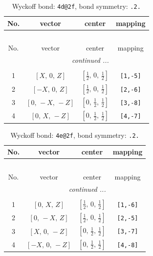 \documentclass[fleqn,8pt]{jsarticle}
\begin{document}
\begin{longtable}{cccc}
\caption{Wyckoff bond: {\tt 4d@2f}, bond symmetry: {\tt .2.}}
 \\
 \hline \hline
No. & vector & center & mapping \\ \hline \endfirsthead

\multicolumn{3}{l}{\tablename\ \thetable{}} \\
 \hline \hline
No. & vector & center & mapping \\ \hline \endhead

 \hline \hline
\multicolumn{3}{r}{\footnotesize\it continued ...} \\ \endfoot

 \hline \hline
\multicolumn{3}{r}{} \\ \endlastfoot

1 & $\left[ X,\, 0,\, Z \right]$ & $\left[ \frac{1}{2},\, 0,\, \frac{1}{2} \right]$ & {\tt [1,-5]} \\ \hline
2 & $\left[ - X,\, 0,\, Z \right]$ & $\left[ \frac{1}{2},\, 0,\, \frac{1}{2} \right]$ & {\tt [2,-6]} \\ \hline
3 & $\left[ 0,\, - X,\, - Z \right]$ & $\left[ 0,\, \frac{1}{2},\, \frac{1}{2} \right]$ & {\tt [3,-8]} \\ \hline
4 & $\left[ 0,\, X,\, - Z \right]$ & $\left[ 0,\, \frac{1}{2},\, \frac{1}{2} \right]$ & {\tt [4,-7]} \\
\end{longtable}
\renewcommand{\arraystretch}{1.2}
\begin{longtable}{cccc}
\caption{Wyckoff bond: {\tt 4e@2f}, bond symmetry: {\tt .2.}}
 \\
 \hline \hline
No. & vector & center & mapping \\ \hline \endfirsthead

\multicolumn{3}{l}{\tablename\ \thetable{}} \\
 \hline \hline
No. & vector & center & mapping \\ \hline \endhead

 \hline \hline
\multicolumn{3}{r}{\footnotesize\it continued ...} \\ \endfoot

 \hline \hline
\multicolumn{3}{r}{} \\ \endlastfoot

1 & $\left[ 0,\, X,\, Z \right]$ & $\left[ \frac{1}{2},\, 0,\, \frac{1}{2} \right]$ & {\tt [1,-6]} \\ \hline
2 & $\left[ 0,\, - X,\, Z \right]$ & $\left[ \frac{1}{2},\, 0,\, \frac{1}{2} \right]$ & {\tt [2,-5]} \\ \hline
3 & $\left[ X,\, 0,\, - Z \right]$ & $\left[ 0,\, \frac{1}{2},\, \frac{1}{2} \right]$ & {\tt [3,-7]} \\ \hline
4 & $\left[ - X,\, 0,\, - Z \right]$ & $\left[ 0,\, \frac{1}{2},\, \frac{1}{2} \right]$ & {\tt [4,-8]} \\
\end{longtable}
\end{document}
